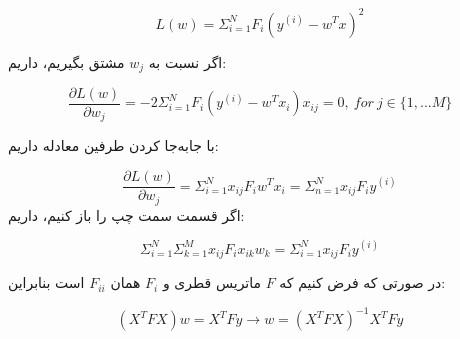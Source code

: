 
$$
L(w) = \Sigma_{i = 1}^{N}F_i(y^{(i)} - w^Tx)^2
$$

اگر نسبت به $w_j$ مشتق بگیریم، داریم:

$$
\frac{\partial L(w)}{\partial w_j} = -2 \Sigma_{i = 1}^{N} F_i(y^{(i)} - w^Tx_i)x_{ij} = 0, \: for \: j \in \{1, ... M\}
$$

با جابه‌جا کردن طرفین معادله داریم:

$$
\frac{\partial L(w)}{\partial w_j} = 
\Sigma_{i = 1}^{N}x_{ij}F_iw^Tx_i = \Sigma_{n = 1}^{N}x_{ij}F_iy^{(i)} 
$$
اگر قسمت سمت چپ را باز کنیم، داریم:

$$
\Sigma_{i = 1}^{N}\Sigma_{k = 1}^{M} x_{ij} F_i x_{ik}w_k = \Sigma_{i = 1}^{N}x_{ij}F_iy^{(i)}
$$

در صورتی که فرض کنیم که $F$ ماتریس قطری  و $F_i$ همان $F_{ii}$  است بنابراین:

$$
(X^TFX)w = X^TFy \rightarrow w = (X^TFX)^{-1}X^TFy
$$